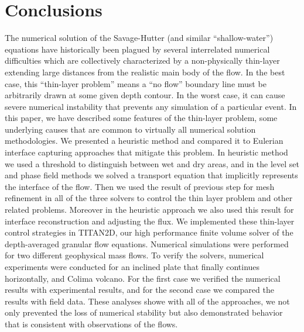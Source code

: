 \documentclass[letterpaper,10pt]{article}
\begin{document}
\section{Conclusions} \label{conclusions}
The numerical solution of the Savage-Hutter (and similar 
``shallow-water'') equations have historically been plagued by 
several interrelated numerical difficulties which are collectively characterized by a non-physically thin-layer extending large distances from the realistic main body of the flow. 
In the best case, this ``thin-layer problem'' means a ``no flow'' boundary line must be arbitrarily drawn at some given depth contour.  In 
the worst case, it can cause severe numerical instability that 
prevents any simulation of a particular event.
In this paper, we 
have described some features of the thin-layer problem,
some underlying causes that are common to virtually all numerical 
solution methodologies. We presented a heuristic method and compared it to Eulerian interface capturing approaches that 
mitigate this problem. In heuristic method we used a threshold to distinguish between wet and dry areas, and in the level set and phase field methods we solved a 
transport equation that implicitly represents the interface of the flow. Then we used the result of previous step for mesh refinement in all of the three solvers to control the thin layer problem and other related problems. Moreover in the heuristic approach we also used this result for interface reconstruction  and adjusting the flux. 
We implemented these thin-layer control strategies in TITAN2D, our high 
performance finite volume solver of the depth-averaged granular 
flow equations.  Numerical simulations were performed for two different geophysical mass flows.
To verify the solvers, numerical experiments were conducted for an inclined plate that finally continues horizontally, and Colima volcano. For the first case we verified the numerical results 
with experimental results, and for the second case we compared the results with field data. These analyses showe with all of the approaches,
we not only prevented the loss of numerical stability but also demonstrated behavior that is consistent with observations of the flows.
%
\end{document}
